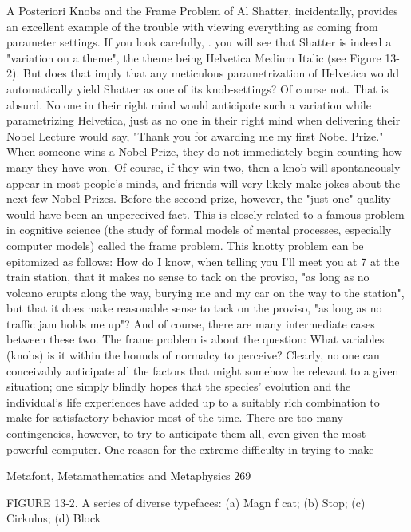               A Posteriori Knobs and the Frame Problem of Al
    Shatter, incidentally, provides an excellent example of the trouble with viewing
everything as coming from parameter settings. If you look carefully, . you will see that
Shatter is indeed a "variation on a theme", the theme being Helvetica Medium Italic (see
Figure 13-2). But does that imply that any meticulous parametrization of Helvetica would
automatically yield Shatter as one of its knob-settings? Of course not. That is absurd. No
one in their right mind would anticipate such a variation while parametrizing Helvetica,
just as no one in their right mind when delivering their Nobel Lecture would say, "Thank
you for awarding me my first Nobel Prize." When someone wins a Nobel Prize, they do
not immediately begin counting how many they have won. Of course, if they win two,
then a knob will spontaneously appear in most people's minds, and friends will very
likely make jokes about the next few Nobel Prizes. Before the second prize, however, the
"just-one" quality would have been an unperceived fact.
    This is closely related to a famous problem in cognitive science (the study of formal
models of mental processes, especially computer models) called the frame problem. This
knotty problem can be epitomized as follows: How do I know, when telling you I'll meet
you at 7 at the train station, that it makes no sense to tack on the proviso, "as long as no
volcano erupts along the way, burying me and my car on the way to the station", but that
it does make reasonable sense to tack on the proviso, "as long as no traffic jam holds me
up"? And of course, there are many intermediate cases between these two. The frame
problem is about the question: What variables (knobs) is it within the bounds of normalcy
to perceive? Clearly, no one can conceivably anticipate all the factors that might
somehow be relevant to a given situation; one simply blindly hopes that the species'
evolution and the individual's life experiences have added up to a suitably rich
combination to make for satisfactory behavior most of the time. There are too many
contingencies, however, to try to anticipate them all, even given the most powerful
computer. One reason for the extreme difficulty in trying to make




Metafont, Metamathematics and Metaphysics                                               269

FIGURE 13-2. A series of diverse typefaces: (a) Magn f cat; (b) Stop; (c) Cirkulus; (d)
Block




